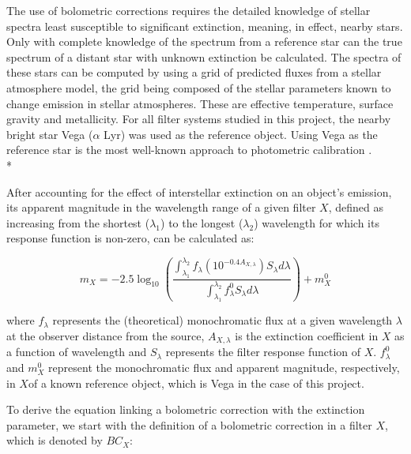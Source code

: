 \documentclass[12pt, a4paper]{report}
\begin{document}
The use of bolometric corrections requires the detailed knowledge of stellar spectra least susceptible to significant extinction, meaning, in effect, nearby stars. Only with complete knowledge of the spectrum from a reference star can the true spectrum of a distant star with unknown extinction be calculated. The spectra of these stars can be computed by using a grid of predicted fluxes from a stellar atmosphere model, the grid being composed of the stellar parameters known to change emission in stellar atmospheres. These are effective temperature, surface gravity and metallicity. For all filter systems studied in this project, the nearby bright star Vega ($\alpha$ Lyr) was used as the reference object. Using Vega as the reference star is the most well-known approach to photometric calibration \citep{2014MNRAS.444..392C}.\\*

After accounting for the effect of interstellar extinction on an object's emission, its apparent magnitude in the wavelength range of a given filter $X$, defined as increasing from the shortest ($\lambda_{1}$) to the longest ($\lambda_{2}$) wavelength for which its response function is non-zero, can be calculated as:

\begin{equation}
m_{X} = -2.5 \log_{10} \left(\frac{ \int_{\lambda_{1}}^{\lambda_{2}} f_{\lambda} \left( 10^{-0.4 A_{X,\lambda}} \right) S_{\lambda} d\lambda }{ \int_{\lambda_{1}}^{\lambda_{2}} f_{\lambda}^{0} S_{\lambda} d\lambda }\right) + m_{X}^{0}
\label{app_mag_def}
\end{equation}

where $f_{\lambda}$ represents the (theoretical) monochromatic flux at a given wavelength $\lambda$ at the observer distance from the source, $A_{X,\lambda}$ is the extinction coefficient in $X$ as a function of wavelength and $S_{\lambda}$ represents the filter response function of $X$. $f_{\lambda}^{0}$ and $m_{X}^{0}$ represent the monochromatic flux and apparent magnitude, respectively, in $X$of a known reference object, which is Vega in the case of this project.


To derive the equation linking a bolometric correction with the extinction parameter, we start with the definition of a bolometric correction in a filter $X$, which is denoted by $BC_{X}$:
\end{document}
